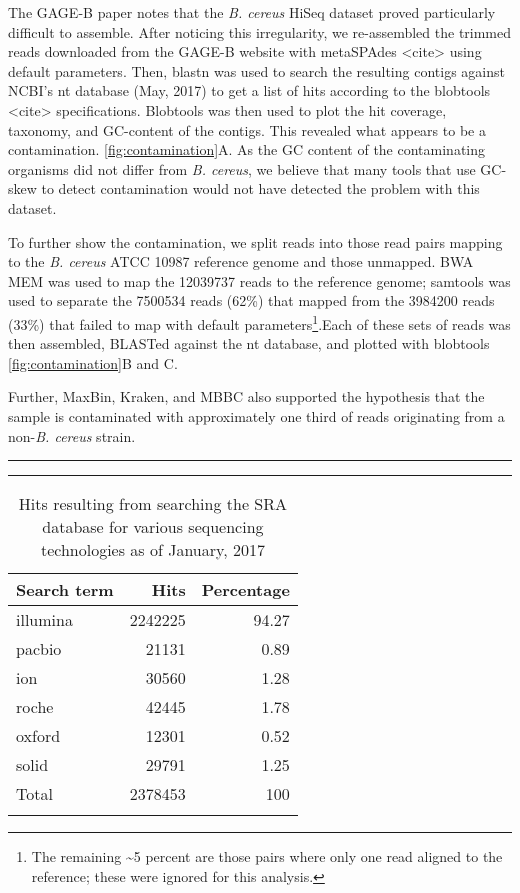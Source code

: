 \documentclass[10pt]{article}
\def \thoughtbr {\begin{center}\noindent\rule{.4\textwidth}{0.4pt}  {\raisebox{-.5ex}{$\sim$}}  \rule{.4\textwidth}{0.4pt}\end{center}}
\def \ttilde {\raisebox{-.5ex}\textasciitilde} %
\begin{document}
The GAGE-B paper \cite{Magoc2013} notes that the \textit{B. cereus} HiSeq dataset proved particularly difficult to assemble. After noticing this irregularity, we re-assembled the trimmed reads downloaded from the GAGE-B website with metaSPAdes <cite> using default parameters.  Then, blastn was used to search the resulting contigs against NCBI's nt database (May, 2017) to get a list of hits according to the blobtools <cite> specifications. Blobtools was then used to plot the hit coverage, taxonomy, and GC-content of the contigs.  This revealed what appears to be a contamination. \ref{fig:contamination}A. As the GC content of the contaminating organisms did not differ from \textit{B. cereus}, we believe that many tools that use GC-skew to detect contamination would not have detected the problem with this dataset.


To further show the contamination, we split reads into those read pairs mapping to the \textit{B. cereus} ATCC 10987 reference genome and those unmapped.  BWA MEM\cite{Li2013} was used to map the 12039737 reads to the reference genome;  samtools was used to separate the 7500534 reads (62\%) that mapped from the 3984200 reads (33\%) that failed to map with default parameters\footnote{The remaining \ttilde5 percent are those pairs where only one read aligned to the reference; these were ignored for this analysis.}.Each of these sets of reads was then assembled, BLASTed against the nt database, and plotted with blobtools \ref{fig:contamination}B and C.


Further, MaxBin\cite{Wu2014}, Kraken, and MBBC\cite{Wang2011} also supported the hypothesis that the sample is contaminated with approximately one third of reads originating from a non-\textit{B. cereus} strain.


\thoughtbr
\newpage

\begin{table}[]
  \centering
  \caption{Hits resulting from searching the SRA database for various sequencing technologies as of January, 2017}
  \label{table:searchterms}
  \begin{tabular}{lrr}
    \toprule
    Search term & Hits & Percentage \\
    \midrule
    illumina & 2242225 & 94.27 \\
    pacbio & 21131 & 0.89 \\
    ion & 30560 & 1.28 \\
    roche & 42445 & 1.78 \\
    oxford & 12301 & 0.52 \\
    solid & 29791 & 1.25 \\
    \arrayrulecolor{lgray}\hline
    Total & 2378453 & 100\\
    \arrayrulecolor{black}
    \bottomrule
\end{tabular}
\end{table}
\end{document}
